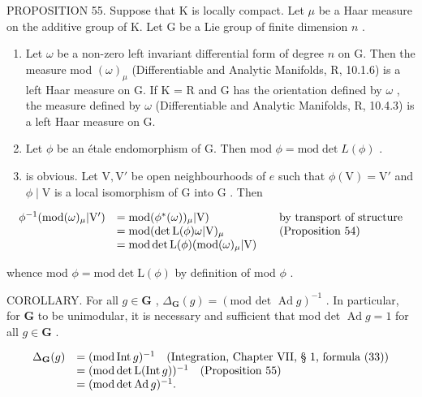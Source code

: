 PROPOSITION 55. Suppose that K is locally compact. Let \(\mu\) be a Haar measure on the additive group of K. Let G be a Lie group of finite dimension \(n\) .

\begin{enumerate}
\def\labelenumi{(\roman{enumi})}
\item
  Let \(\omega\) be a non-zero left invariant differential form of degree \(n\) on G. Then the measure mod \((\omega)_{\mu}\) (Differentiable and Analytic Manifolds, R, 10.1.6) is a left Haar measure on G. If K = R and G has the orientation defined by \(\omega\) , the measure defined by \(\omega\) (Differentiable and Analytic Manifolds, R, 10.4.3) is a left Haar measure on G.
\item
  Let \(\phi\) be an étale endomorphism of G. Then mod \(\phi = \text{mod}\det L(\phi)\) .
\item
  is obvious. Let \(\mathrm{V}, \mathrm{V}'\) be open neighbourhoods of \(e\) such that \(\phi(\mathrm{V}) = \mathrm{V}'\) and \(\phi \mid \mathrm{V}\) is a local isomorphism of \(\mathrm{G}\) into \(\mathrm{G}\) . Then
\end{enumerate}

\[
\begin{array}{r l r l} \phi^ {- 1} (\mathrm{mod} (\omega) _ {\mu}   |   \mathrm{V} ^ {\prime}) & = \mathrm{mod} (\phi^ {*} (\omega)) _ {\mu}   |   \mathrm{V}) & & \text {by transport of structure} \\ & = \mathrm{mod} (\det \mathrm{L} (\phi) \omega   |   \mathrm{V}) _ {\mu} & & \text {(Proposition 54)} \\ & = \mathrm{mod} \det \mathrm{L} (\phi) (\mathrm{mod} (\omega) _ {\mu}   |   \mathrm{V}) \end{array}
\]

whence mod \(\phi = \mathrm{mod}\det \mathrm{L}(\phi)\) by definition of mod \(\phi\) .

COROLLARY. For all \(g \in \mathbf{G}\) , \(\Delta_{\mathbf{G}}(g) = (\text{mod det } \operatorname{Ad} g)^{-1}\) . In particular, for \(\mathbf{G}\) to be unimodular, it is necessary and sufficient that mod det \(\operatorname{Ad} g = 1\) for all \(g \in \mathbf{G}\) .

\[
\begin{array}{r l} \Delta_ {\mathbf {G}} (g) & = (\text {mod} \operatorname{Int} g) ^ {- 1} \quad \text {(Integration, Chapter VII, § 1, formula (33))} \\ & = (\text {mod} \det \operatorname{L} (\operatorname{Int} g)) ^ {- 1} \quad \text {(Proposition 55)} \\ & = (\text {mod} \det \operatorname{Ad} g) ^ {- 1}. \end{array}
\]

